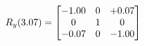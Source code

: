 \documentclass[preview]{standalone}
\begin{document}
\begin{align*}
\special{dvisvgm:raw <g id='unique000'>}R_{y}(3.07) = \begin{bmatrix}-1.00 & 0 & +0.07 \\0 & 1 & 0 \\-0.07 & 0 & -1.00\end{bmatrix}\special{dvisvgm:raw </g>}
\end{align*}
\end{document}

